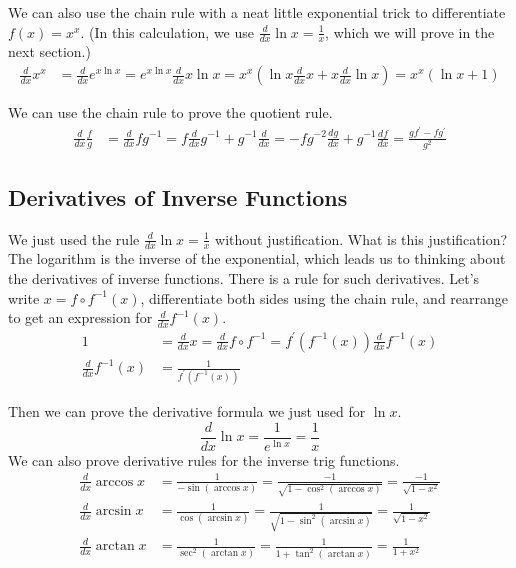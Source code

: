 \documentclass[fleqn]{report}
\begin{document}
\begin{example}
We can also use the chain rule with a neat little exponential
trick to differentiate $f(x) = x^x$. (In
this calculation, we use $\frac{d}{dx} \ln x = \frac{1}{x}$,
which we will prove in the next section.)
\begin{align*}
\frac{d}{dx} x^x & = \frac{d}{dx} e^{x\ln x} = e^{x\ln x}
\frac{d}{dx} x\ln x = x^x (\ln x \frac{d}{dx} x + x
\frac{d}{dx} \ln x) = x^x(\ln x + 1) 
\end{align*}
\end{example}

\begin{example}
We can use the chain rule to prove the quotient rule.
\begin{align*}
\frac{d}{dx} \frac{f}{g} & = \frac{d}{dx} f g^{-1} = 
f \frac{d}{dx} g^{-1} + g^{-1} \frac{d}{dx} = 
-f g^{-2} \frac{dg}{dx} + g^{-1} \frac{df}{dx} = \frac{gf^\prime -
fg^\prime}{g^2} 
\end{align*}
\end{example}

\subsection{Derivatives of Inverse Functions}
\label{derivatives-inverse-functions}

We just used the rule $\frac{d}{dx} \ln x = \frac{1}{x}$
without justification. What is this justification? The
logarithm is the inverse of the exponential, which leads us to
thinking about the derivatives of inverse functions. There is
a rule for such derivatives. Let's write $x = f \circ
f^{-1}(x)$, differentiate both sides using the chain rule, and
rearrange to get an expression for $\frac{d}{dx} f^{-1}(x)$. 
\begin{align*}
1 & = \frac{d}{dx} x = \frac{d}{dx} f \circ f^{-1} = f^\prime (
f^{-1}(x)) \frac{d}{dx} f^{-1}(x) \\
\frac{d}{dx} f^{-1}(x) & = \frac{1}{f^\prime(f^{-1}(x))}
\end{align*}

Then we can prove the derivative formula we just used for $\ln
x$.
\begin{equation*}
\frac{d}{dx} \ln x = \frac{1}{e^{\ln x}} = \frac{1}{x} 
\end{equation*}
We can also prove derivative rules for the inverse trig
functions.
\begin{align*}
\frac{d}{dx} \arccos x & = \frac{1}{-\sin(\arccos x)} =
\frac{-1}{\sqrt{1-\cos^2(\arccos x)}} = \frac{-1}{\sqrt{1-x^2}} \\
\frac{d}{dx} \arcsin x & = \frac{1}{\cos(\arcsin x)} =
\frac{1}{\sqrt{1-\sin^2(\arcsin x)}} = \frac{1}{\sqrt{1-x^2}} \\
\frac{d}{dx} \arctan x & = \frac{1}{\sec^2(\arctan x)} =
\frac{1}{1+\tan^2(\arctan x)} = \frac{1}{1+x^2} 
\end{align*}
\end{document}
